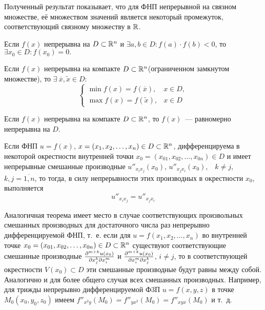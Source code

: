 \documentclass[../main.tex]{subfiles}
\begin{document}
\begin{rem}
		Полученный результат показывает, что для ФНП непрерывной на связном
		множестве, её множеством значений является некоторый промежуток,
		соответствующий связному множеству в $\mathbb{R}$.
	\end{rem}
\begin{crl*}
			Если $f(x)$ непрерывна на $D \subset \mathbb{R}^n$ и $\exists a,b \in D: 
			f(a) \cdot f(b) < 0$, то $\exists x_0 \in D : f(x_0) = 0.$
	\end{crl*}
\begin{thm}[Вейерштрасс]
		Если $f(x)$ непрерывна на компакте $D \subset \mathbb{R}^n$(ограниченном 
		замкнутом множестве), то $\exists\ \overline{x}, \widetilde{x} \in D:$
		\[ 
		\begin{cases}
		\min f(x) = f(\overline{x}),& x \in D, \\
		\max f(x) = f(\widetilde{x}),& x \in D
		\end{cases}
		\]
	\end{thm}
\begin{thm}[Кантор]
		Если $f(x)$ непрерывна на компакте $D \subset \mathbb{R}^n$, то $f(x)$~---
		равномерно непрерывна на $D$.
	\end{thm}
\begin{thm}
		\label{secdiffeq}
		Если ФНП $u = f(x)$, $x = \left(x_1, x_2, \dots, x_n\right)\in 
		D\subset\mathbb{R}^n$, дифференцируема в некоторой окрестности внутренней 
		точки $x_0 = \left(x_{01}, x_{02}, \dots, x_{0n}\right)\in D$ и имеет 
		непрерывные смешанные производные $u''_{x_ix_j}(x_0)$, 
		$u''_{x_jx_i}(x_0)$,\ \ $k\ne j$,\ \ $k, j = \overline{1, n}$, то тогда, 
		в силу непрерывности этих производных в окрестности $x_0$, выполняется
		\begin{equation}
			u''_{x_ix_j} = u''_{x_jx_i}
			\label{11:diff}
		\end{equation}
	\end{thm}
\begin{remark}
		Аналогичная теорема имеет место в случае соответствующих 
		произвольных смешанных производных для достаточного числа 
		раз непрерывно дифференцируемой ФНП, т.~е. если для 
		$u = f\left(x_1, x_2,\dots, x_n\right)$ во внутренней 
		точке $x_0 = \left(x_{01}, x_{02},\dots, x_{0n}\right)
		\in D\subset \mathbb{R}^n$ существуют соответствующие смешанные 
		производные $\frac{\partial ^{m+k}u\left(x_0\right)}{\partial x_j^k\partial x_i^m}$ и 
		$\frac{\partial ^{m+k}u\left(x_0\right)}{\partial x_i^m\partial x_j^k}$, $i\ne j$, 
		то в соответствующей окрестности $V\left(x_0\right)\subset D$ эти 
		смешанные производные будут равны между собой. Аналогично и для более 
		общего случая всех смешанных производных. Например, для трижды 
		непрерывно дифференцируемой Ф3П $u=f\left(x, y, z\right)$ в точке 
		$M_0\left(x_0, y_0, z_0\right)$ имеем
		$f''_{x^2y}\left(M_0\right) = f''_{yx^2}\left(M_0\right) = 
		f''_{xyx}\left(M_0\right)$ и т.~д.
	\end{remark}
\end{document}
